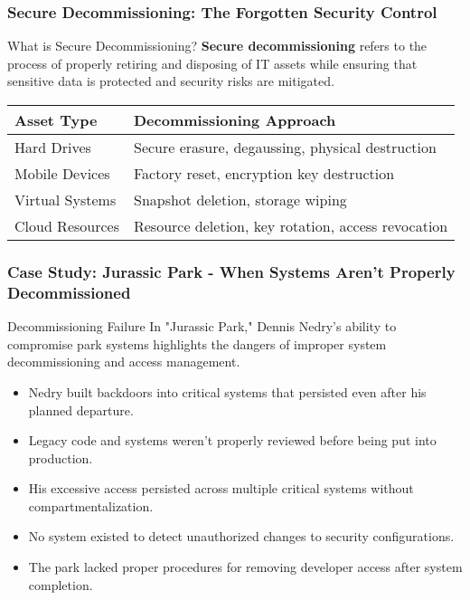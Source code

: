 \documentclass{beamer}
\begin{document}
    \begin{frame}
    \frametitle{Secure Decommissioning: The Forgotten Security Control}
    
    \begin{block}{What is Secure Decommissioning?}
    \textbf{Secure decommissioning} refers to the process of properly retiring and disposing of IT assets while ensuring that sensitive data is protected and security risks are mitigated.
    \end{block}
    
    \begin{table}
    \begin{tabularx}{\textwidth}{|l|X|}
    \hline
    \textbf{Asset Type} & \textbf{Decommissioning Approach} \\
    \hline
    Hard Drives & Secure erasure, degaussing, physical destruction \\
    \hline
    Mobile Devices & Factory reset, encryption key destruction \\
    \hline
    Virtual Systems & Snapshot deletion, storage wiping \\
    \hline
    Cloud Resources & Resource deletion, key rotation, access revocation \\
    \hline
    \end{tabularx}
    \end{table}
    \end{frame}
    
    \begin{frame}
    \frametitle{Case Study: Jurassic Park - When Systems Aren't Properly Decommissioned}
    
    \begin{exampleblock}{Decommissioning Failure}
    In "Jurassic Park," Dennis Nedry's ability to compromise park systems highlights the dangers of improper system decommissioning and access management.
    \end{exampleblock}
    
    \begin{itemize}
    \item Nedry built backdoors into critical systems that persisted even after his planned departure.
    \item Legacy code and systems weren't properly reviewed before being put into production.
    \item His excessive access persisted across multiple critical systems without compartmentalization.
    \item No system existed to detect unauthorized changes to security configurations.
    \item The park lacked proper procedures for removing developer access after system completion.
    \end{itemize}
\end{frame}
\end{document}
